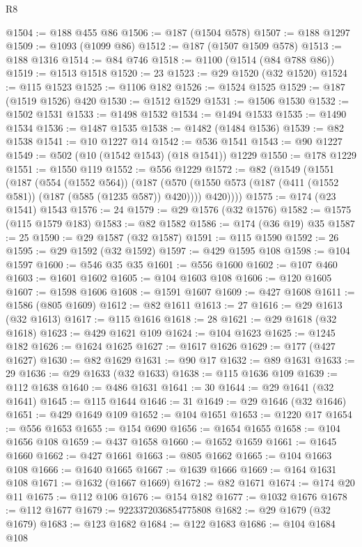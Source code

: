 \begin{lexlean}{R8}
\begin{coremodule}
@1504 := @188 @455 @86
@1506 := @187 (@1504 @578)
@1507 := @188 @1297
@1509 := @1093 (@1099 @86)
@1512 := @187 (@1507 @1509 @578)
@1513 := @188 @1316
@1514 := @84 @746
@1518 := @1100 (@1514 (@84 @788 @86))
@1519 := @1513 @1518
@1520 := 23
@1523 := @29 @1520 (@32 @1520)
@1524 := @115 @1523
@1525 := @1106 @182
@1526 := @1524 @1525
@1529 := @187 (@1519 @1526) @420
@1530 := @1512 @1529
@1531 := @1506 @1530
@1532 := @1502 @1531
@1533 := @1498 @1532
@1534 := @1494 @1533
@1535 := @1490 @1534
@1536 := @1487 @1535
@1538 := @1482 (@1484 @1536)
@1539 := @82 @1538
@1541 := @10 @1227 @14
@1542 := @536 @1541
@1543 := @90 @1227
@1549 := @502 (@10 (@1542 @1543) (@18 @1541)) @1229
@1550 := @178 @1229
@1551 := @1550 @119
@1552 := @556 @1229
@1572 := @82
    (@1549
      (@1551
        (@187
          (@554 (@1552 @564))
          (@187
            (@570 (@1550 @573 (@187 (@411 (@1552 @581)) (@187 (@585 (@1235 @587)) @420))))
            @420))))
@1575 := @174 (@23 @1541) @1543
@1576 := 24
@1579 := @29 @1576 (@32 @1576)
@1582 := @1575 (@115 @1579 @183)
@1583 := @82 @1582
@1586 := @174 (@36 @19) @35
@1587 := 25
@1590 := @29 @1587 (@32 @1587)
@1591 := @115 @1590
@1592 := 26
@1595 := @29 @1592 (@32 @1592)
@1597 := @429 @1595 @108
@1598 := @104 @1597
@1600 := @546 @35 @35
@1601 := @556 @1600
@1602 := @107 @460
@1603 := @1601 @1602
@1605 := @104 @1603 @108
@1606 := @120 @1605
@1607 := @1598 @1606
@1608 := @1591 @1607
@1609 := @427 @1608
@1611 := @1586 (@805 @1609)
@1612 := @82 @1611
@1613 := 27
@1616 := @29 @1613 (@32 @1613)
@1617 := @115 @1616
@1618 := 28
@1621 := @29 @1618 (@32 @1618)
@1623 := @429 @1621 @109
@1624 := @104 @1623
@1625 := @1245 @182
@1626 := @1624 @1625
@1627 := @1617 @1626
@1629 := @177 (@427 @1627)
@1630 := @82 @1629
@1631 := @90 @17
@1632 := @89 @1631
@1633 := 29
@1636 := @29 @1633 (@32 @1633)
@1638 := @115 @1636 @109
@1639 := @112 @1638
@1640 := @486 @1631
@1641 := 30
@1644 := @29 @1641 (@32 @1641)
@1645 := @115 @1644
@1646 := 31
@1649 := @29 @1646 (@32 @1646)
@1651 := @429 @1649 @109
@1652 := @104 @1651
@1653 := @1220 @17
@1654 := @556 @1653
@1655 := @154 @690
@1656 := @1654 @1655
@1658 := @104 @1656 @108
@1659 := @437 @1658
@1660 := @1652 @1659
@1661 := @1645 @1660
@1662 := @427 @1661
@1663 := @805 @1662
@1665 := @104 @1663 @108
@1666 := @1640 @1665
@1667 := @1639 @1666
@1669 := @164 @1631 @108
@1671 := @1632 (@1667 @1669)
@1672 := @82 @1671
@1674 := @174 @20 @11
@1675 := @112 @106
@1676 := @154 @182
@1677 := @1032 @1676
@1678 := @112 @1677
@1679 := 9223372036854775808
@1682 := @29 @1679 (@32 @1679)
@1683 := @123 @1682
@1684 := @122 @1683
@1686 := @104 @1684 @108

\end{coremodule}
\end{lexlean}
